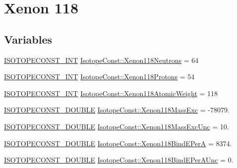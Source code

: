 \hypertarget{group___isotope_const-_xenon-_xe118}{}\section{Xenon 118}
\label{group___isotope_const-_xenon-_xe118}
\subsection*{Variables}
\begin{DoxyCompactItemize}
\item 
\mbox{\hyperlink{group___isotope_const-_macros_ga5f18360b3e99483a35c32d789e62621c}{I\+S\+O\+T\+O\+P\+E\+C\+O\+N\+S\+T\+\_\+\+I\+NT}} \mbox{\hyperlink{group___isotope_const-_xenon-_xe118_ga719f86ac7331b954dd779b4ba5bf387b}{Isotope\+Const\+::\+Xenon118\+Neutrons}} = 64
\item 
\mbox{\hyperlink{group___isotope_const-_macros_ga5f18360b3e99483a35c32d789e62621c}{I\+S\+O\+T\+O\+P\+E\+C\+O\+N\+S\+T\+\_\+\+I\+NT}} \mbox{\hyperlink{group___isotope_const-_xenon-_xe118_gafb4a71cb52c5a5f3f8e10a027ec31ee8}{Isotope\+Const\+::\+Xenon118\+Protons}} = 54
\item 
\mbox{\hyperlink{group___isotope_const-_macros_ga5f18360b3e99483a35c32d789e62621c}{I\+S\+O\+T\+O\+P\+E\+C\+O\+N\+S\+T\+\_\+\+I\+NT}} \mbox{\hyperlink{group___isotope_const-_xenon-_xe118_ga2884a2c60bc9b7ad8f99cf633fb41020}{Isotope\+Const\+::\+Xenon118\+Atomic\+Weight}} = 118
\item 
\mbox{\hyperlink{group___isotope_const-_macros_ga8f45a7272ce02c0b4c65c44636ed719a}{I\+S\+O\+T\+O\+P\+E\+C\+O\+N\+S\+T\+\_\+\+D\+O\+U\+B\+LE}} \mbox{\hyperlink{group___isotope_const-_xenon-_xe118_gafd5d265789a3a6c4a5d30cd727303a08}{Isotope\+Const\+::\+Xenon118\+Mass\+Exc}} = -\/78079.
\item 
\mbox{\hyperlink{group___isotope_const-_macros_ga8f45a7272ce02c0b4c65c44636ed719a}{I\+S\+O\+T\+O\+P\+E\+C\+O\+N\+S\+T\+\_\+\+D\+O\+U\+B\+LE}} \mbox{\hyperlink{group___isotope_const-_xenon-_xe118_gac97e3ac981676204fbefc6a67b132de4}{Isotope\+Const\+::\+Xenon118\+Mass\+Exc\+Unc}} = 10.
\item 
\mbox{\hyperlink{group___isotope_const-_macros_ga8f45a7272ce02c0b4c65c44636ed719a}{I\+S\+O\+T\+O\+P\+E\+C\+O\+N\+S\+T\+\_\+\+D\+O\+U\+B\+LE}} \mbox{\hyperlink{group___isotope_const-_xenon-_xe118_gad03384c38699be306f30892f2bebad13}{Isotope\+Const\+::\+Xenon118\+Bind\+E\+PerA}} = 8374.
\item 
\mbox{\hyperlink{group___isotope_const-_macros_ga8f45a7272ce02c0b4c65c44636ed719a}{I\+S\+O\+T\+O\+P\+E\+C\+O\+N\+S\+T\+\_\+\+D\+O\+U\+B\+LE}} \mbox{\hyperlink{group___isotope_const-_xenon-_xe118_gaf35d782da835e731b0ae8aeeb3ac61fa}{Isotope\+Const\+::\+Xenon118\+Bind\+E\+Per\+A\+Unc}} = 0.

\end{DoxyCompactItemize}
